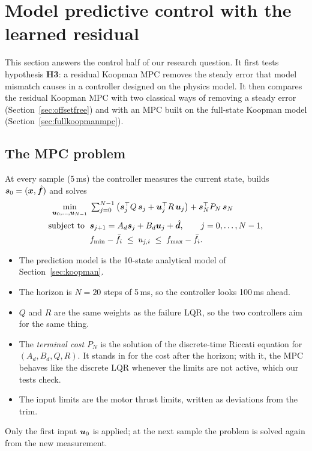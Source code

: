 \section{Model predictive control with the learned residual}\label{sec:mpc}
This section answers the control half of our research question. It first tests hypothesis \textbf{H3}: a residual Koopman MPC removes the steady error that model mismatch causes in a controller designed on the physics model. It then compares the residual Koopman MPC with two classical ways of removing a steady error (Section~\ref{sec:offsetfree}) and with an MPC built on the full-state Koopman model (Section~\ref{sec:fullkoopmanmpc}).

\subsection{The MPC problem}
At every sample (5\,ms) the controller measures the current state, builds $\boldsymbol{s}_0 = (\boldsymbol{x}, \hat{\boldsymbol{f}})$ and solves
\begin{equation}\label{eq:mpc}
\begin{aligned}
\min_{\boldsymbol{u}_0,\dots,\boldsymbol{u}_{N-1}} \;& \textstyle\sum_{j=0}^{N-1}\big(\boldsymbol{s}_j^\top Q\,\boldsymbol{s}_j + \boldsymbol{u}_j^\top R\,\boldsymbol{u}_j\big) + \boldsymbol{s}_N^\top P_N\,\boldsymbol{s}_N\\
\text{subject to }\;& \boldsymbol{s}_{j+1} = A_d\boldsymbol{s}_j + B_d\boldsymbol{u}_j + \hat{\boldsymbol{d}},\qquad j = 0,\dots,N-1,\\
& f_{\min}-\bar f_i \;\le\; u_{j,i} \;\le\; f_{\max}-\bar f_i .
\end{aligned}
\end{equation}
\begin{itemize}
  \item The prediction model is the 10-state analytical model of Section~\ref{sec:koopman}.
  \item The horizon is $N = 20$ steps of 5\,ms, so the controller looks 100\,ms ahead.
  \item $Q$ and $R$ are the same weights as the failure LQR, so the two controllers aim for the same thing.
  \item The \emph{terminal cost} $P_N$ is the solution of the discrete-time Riccati equation for $(A_d, B_d, Q, R)$. It stands in for the cost after the horizon; with it, the MPC behaves like the discrete LQR whenever the limits are not active, which our tests check.
  \item The input limits are the motor thrust limits, written as deviations from the trim.
\end{itemize}
Only the first input $\boldsymbol{u}_0$ is applied; at the next sample the problem is solved again from the new measurement.

